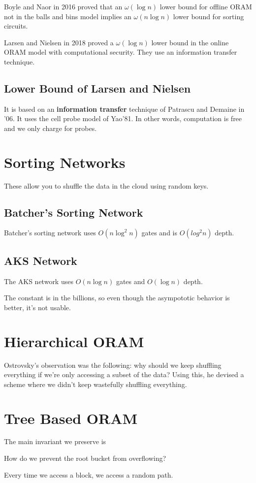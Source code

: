 \documentclass{article}
\theoremstyle{definition}
\begin{document}
Boyle and Naor in 2016 proved that an $\omega(\log n)$ lower bound for offline ORAM not in the
balls and bins model implies an $\omega(n \log n)$ lower bound for sorting circuits.

Larsen and Nielsen in 2018 proved a $\omega(\log n)$ lower bound in the online ORAM model with computational security.
They use an information transfer technique.

\subsection{Lower Bound of Larsen and Nielsen}

It is based on an \textbf{information transfer} technique of Patrascu and Demaine in '06. It uses the cell probe model
of Yao'81. In other words, computation is free and we only charge for probes.



\newpage

\section{Sorting Networks}

These allow you to shuffle the data in the cloud using random keys.

\subsection{Batcher's Sorting Network}

Batcher's sorting network uses $O(n \log^{2} n)$ gates and is $O(log^{2} n)$ depth.

\subsection{AKS Network}

The AKS network uses $O(n \log n)$ gates and $O(\log n)$ depth.

The constant is in the billions, so even though the asympototic behavior is better, it's not usable.

\newpage

\section{Hierarchical ORAM}

Ostrovsky's observation was the following: why should we keep shuffling everything
if we're only accessing a subset of the data? Using this, he devised a scheme where
we didn't keep wastefully shuffling everything.



\newpage

\section{Tree Based ORAM}

The main invariant we preserve is

How do we prevent the root bucket from overflowing?

Every time we access a block, we access a random path.



\newpage
\end{document}
